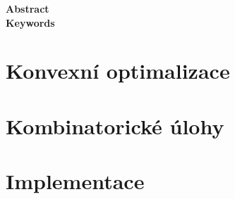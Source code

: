 \documentclass[a4paper,oneside,12pt]{book}
\theoremstyle{definition}
\theoremstyle{plain}
\theoremstyle{remark}
\begin{document}
\newpage
\thispagestyle{empty}
{\Large
\noindent\textbf{Abstract}}\\[3pt]

\vfill
{\Large
\noindent\textbf{Keywords}}\\[3pt]

%

\tableofcontents

\setcounter{page}{1}

\pagebreak


{
  \pagestyle{plain}
  
  
  
  \clearpage
}


\part{Konvexní optimalizace}









\clearpage


\part{Kombinatorické úlohy}







\clearpage


\part{Implementace}





\clearpage




\clearpage




\end{document}
